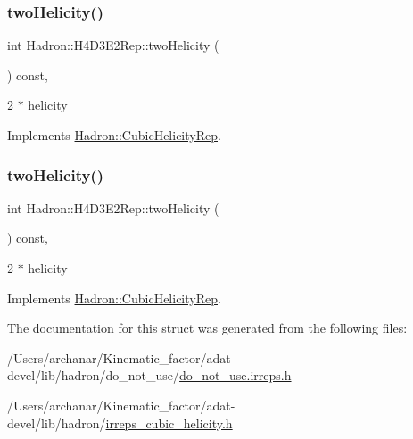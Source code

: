 \subsubsection{\texorpdfstring{twoHelicity()}{twoHelicity()}\hspace{0.1cm}{\footnotesize\ttfamily [2/3]}}
{\footnotesize\ttfamily int Hadron\+::\+H4\+D3\+E2\+Rep\+::two\+Helicity (\begin{DoxyParamCaption}{ }\end{DoxyParamCaption}) const\hspace{0.3cm}{\ttfamily [inline]}, {\ttfamily [virtual]}}

2 $\ast$ helicity 

Implements \mbox{\hyperlink{structHadron_1_1CubicHelicityRep_af507aa56fc2747eacc8cb6c96db31ecc}{Hadron\+::\+Cubic\+Helicity\+Rep}}.

\mbox{\label{structHadron_1_1H4D3E2Rep_ad32976f01733eae853ca8ec5fa040b10}} 
\subsubsection{\texorpdfstring{twoHelicity()}{twoHelicity()}\hspace{0.1cm}{\footnotesize\ttfamily [3/3]}}
{\footnotesize\ttfamily int Hadron\+::\+H4\+D3\+E2\+Rep\+::two\+Helicity (\begin{DoxyParamCaption}{ }\end{DoxyParamCaption}) const\hspace{0.3cm}{\ttfamily [inline]}, {\ttfamily [virtual]}}

2 $\ast$ helicity 

Implements \mbox{\hyperlink{structHadron_1_1CubicHelicityRep_af507aa56fc2747eacc8cb6c96db31ecc}{Hadron\+::\+Cubic\+Helicity\+Rep}}.



The documentation for this struct was generated from the following files\+:\begin{DoxyCompactItemize}
\item 
/\+Users/archanar/\+Kinematic\+\_\+factor/adat-\/devel/lib/hadron/do\+\_\+not\+\_\+use/\mbox{\hyperlink{adat-devel_2lib_2hadron_2do__not__use_2do__not__use_8irreps_8h}{do\+\_\+not\+\_\+use.\+irreps.\+h}}\item 
/\+Users/archanar/\+Kinematic\+\_\+factor/adat-\/devel/lib/hadron/\mbox{\hyperlink{adat-devel_2lib_2hadron_2irreps__cubic__helicity_8h}{irreps\+\_\+cubic\+\_\+helicity.\+h}}\end{DoxyCompactItemize}
